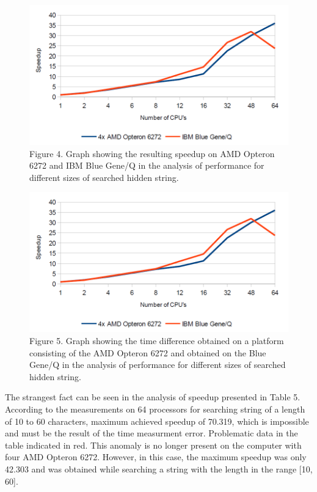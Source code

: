 \documentclass[10pt, a5paper]{article}
\begin{document}
\begin{figure}[h!]
  \centering
  \includegraphics[width=\textwidth]{103_2014_w_Kwiatkowska_speedup.png}
  Figure 4. Graph showing the resulting speedup on AMD Opteron 6272 and IBM Blue Gene/Q in the analysis of performance for different sizes of searched hidden string.
\end{figure}

\begin{figure}[h!]
  \centering
  \includegraphics[width=\textwidth]{103_2014_w_Kwiatkowska_speedup.png}
  Figure 5. Graph showing the time difference obtained on a platform consisting of the AMD Opteron 6272 and obtained on the Blue Gene/Q in the analysis of performance for different sizes of searched hidden string.
\end{figure}

The strangest fact can be seen in the analysis of speedup presented in Table 5. According to the measurements on 64 processors for searching string of a length of 10 to 60 characters, maximum achieved speedup of 70.319, which is impossible and must be the result of the time measurment error. Problematic data in the table indicated in red. This anomaly is no longer present on the computer with four AMD Opteron 6272. However, in this case, the maximum speedup was only 42.303 and was obtained while searching a string with the length in the range [10, 60].
\end{document}
